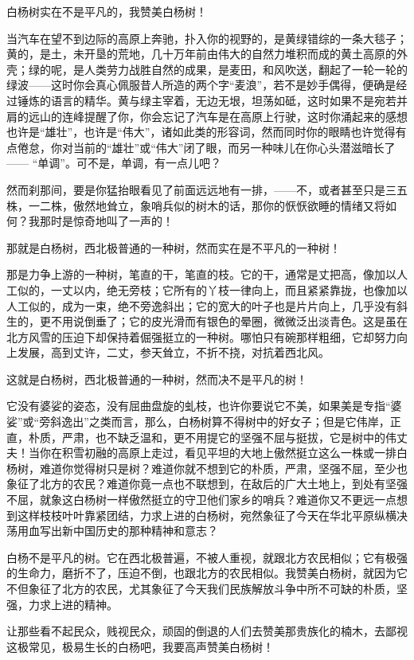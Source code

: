 \documentclass[12pt,UTF-8,openany]{ctexbook}
\begin{document}
\begin{normalsize}
    
    白杨树实在不是平凡的，我赞美白杨树！
    
    当汽车在望不到边际的高原上奔驰，扑入你的视野的，是黄绿错综的一条大毯子；黄的，是土，未开垦的荒地，几十万年前由伟大的自然力堆积而成的黄土高原的外壳；绿的呢，是人类劳力战胜自然的成果，是麦田，和风吹送，翻起了一轮一轮的绿波——这时你会真心佩服昔人所造的两个字“麦浪”，若不是妙手偶得，便确是经过锤炼的语言的精华。黄与绿主宰着，无边无垠，坦荡如砥，这时如果不是宛若并肩的远山的连峰提醒了你，你会忘记了汽车是在高原上行驶，这时你涌起来的感想也许是“雄壮”，也许是“伟大”，诸如此类的形容词，然而同时你的眼睛也许觉得有点倦怠，你对当前的“雄壮”或“伟大”闭了眼，而另一种味儿在你心头潜滋暗长了—— “单调”。可不是，单调，有一点儿吧？
    
    然而刹那间，要是你猛抬眼看见了前面远远地有一排，——不，或者甚至只是三五株，一二株，傲然地耸立，象哨兵似的树木的话，那你的恹恹欲睡的情绪又将如何？我那时是惊奇地叫了一声的！
    
    那就是白杨树，西北极普通的一种树，然而实在是不平凡的一种树！
    
    那是力争上游的一种树，笔直的干，笔直的枝。它的干，通常是丈把高，像加以人工似的，一丈以内，绝无旁枝；它所有的丫枝一律向上，而且紧紧靠拢，也像加以人工似的，成为一束，绝不旁逸斜出；它的宽大的叶子也是片片向上，几乎没有斜生的，更不用说倒垂了；它的皮光滑而有银色的晕圈，微微泛出淡青色。这是虽在北方风雪的压迫下却保持着倔强挺立的一种树。哪怕只有碗那样粗细，它却努力向上发展，高到丈许，二丈，参天耸立，不折不挠，对抗着西北风。
    
    这就是白杨树，西北极普通的一种树，然而决不是平凡的树！
    
    它没有婆娑的姿态，没有屈曲盘旋的虬枝，也许你要说它不美，如果美是专指“婆娑”或“旁斜逸出”之类而言，那么，白杨树算不得树中的好女子；但是它伟岸，正直，朴质，严肃，也不缺乏温和，更不用提它的坚强不屈与挺拔，它是树中的伟丈夫！当你在积雪初融的高原上走过，看见平坦的大地上傲然挺立这么一株或一排白杨树，难道你觉得树只是树？难道你就不想到它的朴质，严肃，坚强不屈，至少也象征了北方的农民？难道你竟一点也不联想到，在敌后的广大土地上，到处有坚强不屈，就象这白杨树一样傲然挺立的守卫他们家乡的哨兵？难道你又不更远一点想到这样枝枝叶叶靠紧团结，力求上进的白杨树，宛然象征了今天在华北平原纵横决荡用血写出新中国历史的那种精神和意志？
    
    白杨不是平凡的树。它在西北极普遍，不被人重视，就跟北方农民相似；它有极强的生命力，磨折不了，压迫不倒，也跟北方的农民相似。我赞美白杨树，就因为它不但象征了北方的农民，尤其象征了今天我们民族解放斗争中所不可缺的朴质，坚强，力求上进的精神。
    
    让那些看不起民众，贱视民众，顽固的倒退的人们去赞美那贵族化的楠木，去鄙视这极常见，极易生长的白杨吧，我要高声赞美白杨树！
    
\end{normalsize}
\end{document}
